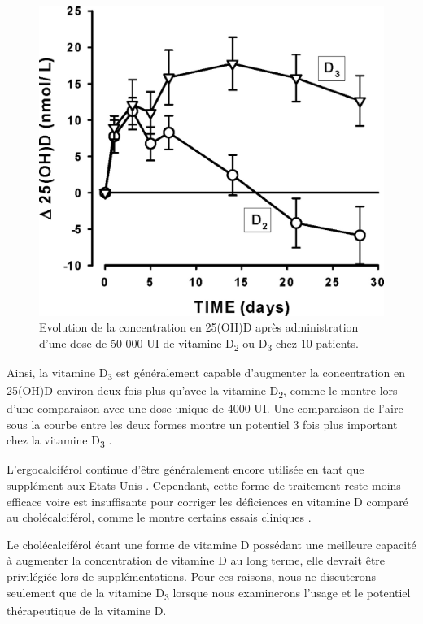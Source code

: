 \documentclass[
  a4paper,
  DIV=11,
  numbers=noendperiod,
  listof=totoc]{scrreprt}
\begin{document}
\begin{figure}

{\centering \includegraphics[width=4.64583in,height=\textheight]{figures/PK_D2_vs_D3.jpeg}

}

\caption{\label{fig-PK-VD}Evolution de la concentration en 25(OH)D après
administration d'une dose de 50 000 UI de vitamine D\textsubscript{2} ou
D\textsubscript{3} chez 10 patients. \textcite{Armas.2004}}

\end{figure}

Ainsi, la vitamine D\textsubscript{3} est généralement capable
d'augmenter la concentration en 25(OH)D environ deux fois plus qu'avec
la vitamine D\textsubscript{2}, comme le montre \textcite{Trang.1998}
lors d'une comparaison avec une dose unique de 4000 UI. Une comparaison
de l'aire sous la courbe entre les deux formes montre un potentiel 3
fois plus important chez la vitamine D\textsubscript{3}
\autocite{Armas.2004}.

L'ergocalciférol continue d'être généralement encore utilisée en tant
que supplément aux Etats-Unis \autocite{Houghton.2006}. Cependant, cette
forme de traitement reste moins efficace voire est insuffisante pour
corriger les déficiences en vitamine D comparé au cholécalciférol, comme
le montre certains essais cliniques \autocite{Boyle.2005}.

Le cholécalciférol étant une forme de vitamine D possédant une meilleure
capacité à augmenter la concentration de vitamine D au long terme, elle
devrait être privilégiée lors de supplémentations. Pour ces raisons,
nous ne discuterons seulement que de la vitamine D\textsubscript{3}
lorsque nous examinerons l'usage et le potentiel thérapeutique de la
vitamine D.
\end{document}
